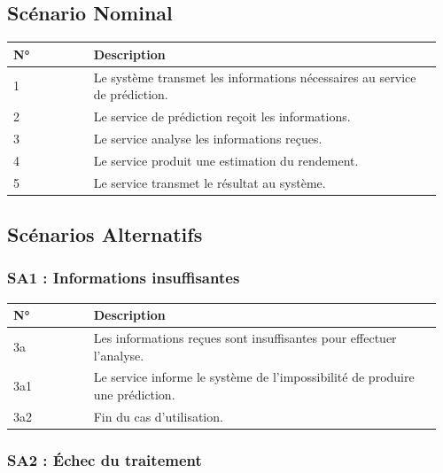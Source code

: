 \hypertarget{scuxe9nario-nominal-7}{%
\subsection{Scénario Nominal}\label{scuxe9nario-nominal-7}}

\begin{longtable}{@{}p{0.18\linewidth}p{0.78\linewidth}@{}}
\toprule
\rowcolors{2}{gray!10}{white}
\textbf{N°} & \textbf{Description} \\
\midrule
\endhead
1 & Le système transmet les informations nécessaires au service de
prédiction. \\
2 & Le service de prédiction reçoit les informations. \\
3 & Le service analyse les informations reçues. \\
4 & Le service produit une estimation du rendement. \\
5 & Le service transmet le résultat au système. \\
\bottomrule
\end{longtable}

\hypertarget{scuxe9narios-alternatifs-7}{%
\subsection{Scénarios Alternatifs}\label{scuxe9narios-alternatifs-7}}

\hypertarget{sa1-informations-insuffisantes}{%
\subsubsection{SA1 : Informations
insuffisantes}\label{sa1-informations-insuffisantes}}

\begin{longtable}{@{}p{0.18\linewidth}p{0.78\linewidth}@{}}
\toprule
\rowcolors{2}{gray!10}{white}
\textbf{N°} & \textbf{Description} \\
\midrule
\endhead
3a & Les informations reçues sont insuffisantes pour effectuer
l'analyse. \\
3a1 & Le service informe le système de l'impossibilité de produire une
prédiction. \\
3a2 & Fin du cas d'utilisation. \\
\bottomrule
\end{longtable}

\hypertarget{sa2-uxe9chec-du-traitement}{%
\subsubsection{SA2 : Échec du
traitement}\label{sa2-uxe9chec-du-traitement}}

